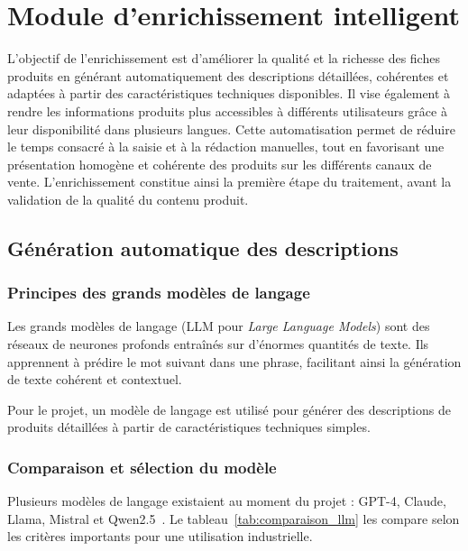 \section{Module d'enrichissement intelligent}

L'objectif de l'enrichissement est d'améliorer la qualité et la richesse des fiches produits en générant automatiquement des descriptions détaillées, cohérentes et adaptées à partir des caractéristiques techniques disponibles. Il vise également à rendre les informations produits plus accessibles à différents utilisateurs grâce à leur disponibilité dans plusieurs langues. Cette automatisation permet de réduire le temps consacré à la saisie et à la rédaction manuelles, tout en favorisant une présentation homogène et cohérente des produits sur les différents canaux de vente. L'enrichissement constitue ainsi la première étape du traitement, avant la validation de la qualité du contenu produit.

\subsection{Génération automatique des descriptions}

\subsubsection{Principes des grands modèles de langage}

Les grands modèles de langage (LLM pour \textit{Large Language Models}) sont des réseaux de neurones profonds entraînés sur d'énormes quantités de texte. Ils apprennent à prédire le mot suivant dans une phrase, facilitant ainsi la génération de texte cohérent et contextuel.

Pour le projet, un modèle de langage est utilisé pour générer des descriptions de produits détaillées à partir de caractéristiques techniques simples.

\subsubsection{Comparaison et sélection du modèle}

Plusieurs modèles de langage existaient au moment du projet : GPT-4, Claude, Llama, Mistral et Qwen2.5~\cite{llm_models}. Le tableau~\ref{tab:comparaison_llm} les compare selon les critères importants pour une utilisation industrielle.

